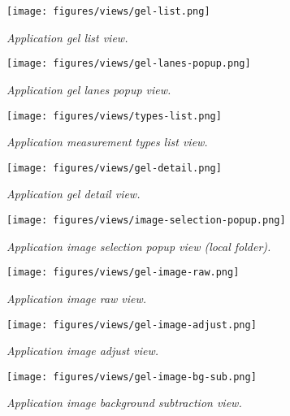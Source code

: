 \begin{figure}[ht]
    \centering
    \texttt{[image: figures/views/gel-list.png]}
    \caption{\textit{Application gel list view.}}
    \label{fig:gel-list}
\end{figure}

\begin{figure}[ht]
    \centering
    \texttt{[image: figures/views/gel-lanes-popup.png]}
    \caption{\textit{Application gel lanes popup view.}}
    \label{fig:gel-lanes-popup}
\end{figure}

\begin{figure}[ht]
    \centering
    \texttt{[image: figures/views/types-list.png]}
    \caption{\textit{Application measurement types list view.}}
    \label{fig:types-list}
\end{figure}

\begin{figure}[ht]
    \centering
    \texttt{[image: figures/views/gel-detail.png]}
    \caption{\textit{Application gel detail view.}}
    \label{fig:gel-detail}
\end{figure}

\begin{figure}[ht]
    \centering
    \texttt{[image: figures/views/image-selection-popup.png]}
    \caption{\textit{Application image selection popup view (local folder).}}
    \label{fig:gel-image-selection-popup}
\end{figure}

\begin{figure}[ht]
    \centering
    \texttt{[image: figures/views/gel-image-raw.png]}
    \caption{\textit{Application image raw view.}}
    \label{fig:gel-image-raw}
\end{figure}

\begin{figure}[ht]
    \centering
    \texttt{[image: figures/views/gel-image-adjust.png]}
    \caption{\textit{Application image adjust view.}}
    \label{fig:gel-image-adjust}
\end{figure}

\begin{figure}[ht]
    \centering
    \texttt{[image: figures/views/gel-image-bg-sub.png]}
    \caption{\textit{Application image background subtraction view.}}
    \label{fig:gel-image-bg-sub}
\end{figure}

